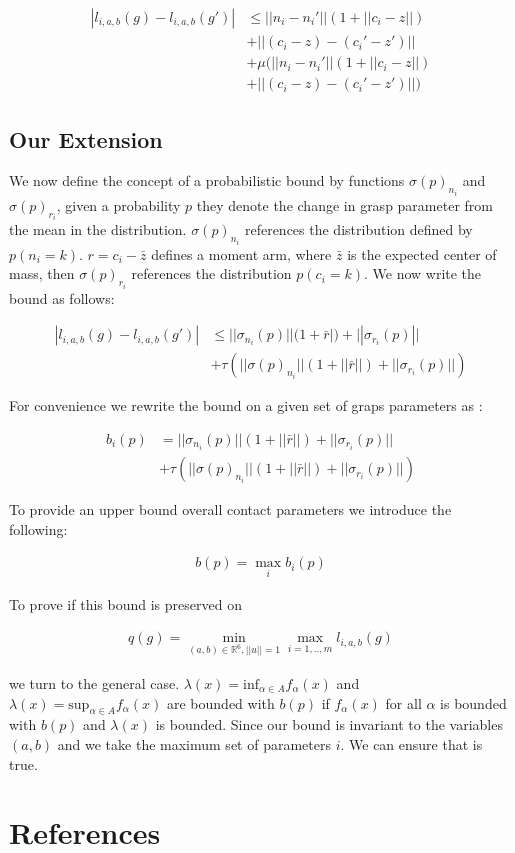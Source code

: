 \documentclass[letterpaper, 10 pt, conference]{ieeeconf}  %
\begin{document}
\begin{align*}
|l_{i,a,b}(g) - l_{i,a,b}(g')| &\leq ||n_i - n_i'||(1+||c_i - z||) \\
					&+ ||(c_i - z)-(c_i'-z')|| \\
					&+ \mu(||n_i - n_i'||(1+||c_i - z||)\\
					&+||(c_i - z)-(c_i'-z')||)
\end{align*}

\subsection{Our Extension}

We now define the concept of a probabilistic bound by functions $\sigma(p)_{n_i}$ and $\sigma(p)_{r_i}$, given a probability $p$ they denote the change in grasp parameter from the mean in the distribution.
$\sigma(p)_{n_i}$ references the distribution defined by $p(n_i = k)$.
$r = c_i - \bar{z}$ defines a moment arm, where $\bar{z}$ is the expected center of mass, then $\sigma(p)_{r_i}$ references the distribution $p(c_i = k)$.
We now write the bound as follows: 

 \begin{align*}
|l_{i,a,b}(g) - l_{i,a,b}(g')| &\leq ||\sigma_{n_i}(p)||(1+\bar{r}|) + ||\sigma_{r_i}(p)|| \\
                                      &+ \tau(||\sigma(p)_{n_i}||(1+||\bar{r}||)+||\sigma_{r_i}(p)||)
\end{align*}

For convenience we rewrite the bound on a given set of graps parameters as : 

 \begin{align*}
b_i(p) &= ||\sigma_{n_i}(p)||(1+||\bar{r}||) + ||\sigma_{r_i}(p)|| \\
                                      &+ \tau(||\sigma(p)_{n_i}||(1+||\bar{r}||)+||\sigma_{r_i}(p)||)
\end{align*}

To provide an upper bound overall contact parameters we introduce the following: 

\begin{align}
b(p)  = \max_{i} b_i(p)
\end{align}

To prove if  this bound is preserved on

 \begin{align}
 q(g) = \min_{(a,b) \in \mathbb{R}^6, ||u||=1} \max_{i=1,..,m} l_{i,a,b}(g)
 \end{align}
 
we turn to the general case.
$\lambda(x) = \mbox{inf}_{\alpha \in A} f_\alpha(x)$ and $\lambda(x) = \mbox{sup}_{\alpha \in A} f_\alpha(x)$ are bounded with $b(p)$ if $f_\alpha(x)$ for all $\alpha$ is bounded with $b(p)$ and $\lambda(x)$ is bounded.
Since our bound is invariant to the variables $(a,b)$ and we take the maximum set of parameters $i$.
We can ensure that is true.



\section{References}



\end{document}
